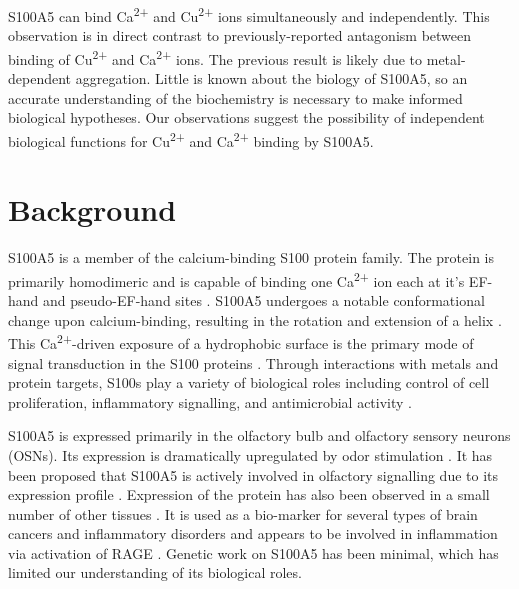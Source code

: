 S100A5 can bind Ca\textsuperscript{2+} and Cu\textsuperscript{2+} 
ions simultaneously and independently. This observation is in direct
contrast to previously-reported antagonism between binding of Cu\textsuperscript{2+} 
and Ca\textsuperscript{2+} ions. The previous result is likely due
to metal-dependent aggregation. Little is known about the biology
of S100A5, so an accurate understanding of the biochemistry is necessary
to make informed biological hypotheses. Our observations suggest the
possibility of independent biological functions for Cu\textsuperscript{2+} 
and Ca\textsuperscript{2+} binding by S100A5.


\section{Background}
S100A5 is a member of the calcium-binding S100 protein family. The
protein is primarily homodimeric and is capable of binding one Ca\textsuperscript{2+} ion
each at it's EF-hand and pseudo-EF-hand sites \cite{bertini_solution_2009,kim_biophysical_2017}.
S100A5 undergoes a notable conformational change upon calcium-binding,
resulting in the rotation and extension of a helix \cite{bertini_solution_2009}.
This Ca\textsuperscript{2+}-driven exposure of a hydrophobic surface
is the primary mode of signal transduction in the S100 proteins \cite{santamaria-kisiel_calcium-dependent_2006}.
Through interactions with metals and protein targets, S100s play a
variety of biological roles including control of cell proliferation,
inflammatory signalling, and antimicrobial activity \cite{leclerc_binding_2009,heizmann_new_nodate,zhu_s100a16_2016,donato_functions_2013}. 

S100A5 is expressed primarily in the olfactory bulb and olfactory
sensory neurons (OSNs). Its expression is dramatically upregulated
by odor stimulation \cite{fischl_activity-dependent_2014,schafer_brain_2000,teratani_restricted_2002}.
It has been proposed that S100A5 is actively involved in olfactory
signalling due to its expression profile \cite{schafer_brain_2000}.
Expression of the protein has also been observed in a small number
of other tissues \cite{teratani_restricted_2002}. It is used as
a bio-marker for several types of brain cancers and inflammatory disorders
and appears to be involved in inflammation via activation of RAGE
\cite{cho_pentamidine_2016,kim_biophysical_2017,hancq_s100a5:_2004}.
Genetic work on S100A5 has been minimal, which has limited our understanding
of its biological roles.

